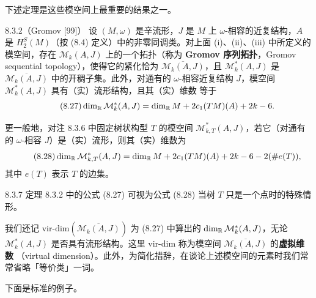 下述定理是这些模空间上最重要的结果之一。

\begin{wthm}{8.3.2}（Gromov [99]）
  设 $(M,\omega)$ 是辛流形，$J$ 是 $M$ 上 $\omega$-相容的近复结构，$A$ 是 $H_2^S(M)$（按 (8.4)
  定义）中的非零同调类。对上面 (i)、(ii)、(iii) 中所定义的模空间，存在
  $\mathcal{M}_k(A,J)$ 上的一个拓扑（称为 \textbf{Gromov 序列拓扑}，Gromov sequential
  topology），使得它的紧化恰为 $\overline{\mathcal{M}_k(A,J)}$，且
  $\mathcal{M}^*_k(A,J)$ 是 $\overline{\mathcal{M}_k(A,J)}$ 中的开稠子集。此外，对通有的
  $\omega$-相容近复结构 $J$，模空间 $\mathcal{M}^*_k(A,J)$ 具有（实）流形结构，且其（实）维数
  等于
  \begin{equation}\tag{8.27}
    \dim_{\mathbb{R}}\mathcal{M}^*_k(A,J)
      =\dim_{\mathbb{R}} M+2c_1(TM)(A)+2k-6.
  \end{equation}
\end{wthm}

更一般地，对注 8.3.6 中固定树状构型 $T$ 的模空间 $\mathcal{M}^*_{k,T}(A,J)$，若它（对通有的
$\omega$-相容 $J$）是（实）流形，则其（实）维数为
\begin{equation}\tag{8.28}
  \dim_{\mathbb{R}}\mathcal{M}^*_{k,T}(A,J)
    =\dim_{\mathbb{R}} M+2c_1(TM)(A)+2k-6-2(\#e(T)),
\end{equation}
其中 $e(T)$ 表示 $T$ 的边集。

\begin{wrem}{8.3.7}
  定理 8.3.2 中的公式 (8.27) 可视为公式 (8.28) 当树 $T$ 只是一个点时的特殊情形。
\end{wrem}

我们还记 $\mathrm{vir\text{-}dim}(\overline{\mathcal{M}_k(A,J)})$ 为 (8.27) 中算出的
$\dim_{\mathbb{R}}\mathcal{M}^*_k(A,J)$，无论 $\mathcal{M}^*_k(A,J)$ 是否具有流形结构。这里
$\mathrm{vir\text{-}dim}$ 称为模空间 $\overline{\mathcal{M}_k(A,J)}$ 的\textbf{虚拟维数}
（virtual dimension）。此外，为简化措辞，在谈论上述模空间的元素时我们常常省略「等价类」一词。

下面是标准的例子。

